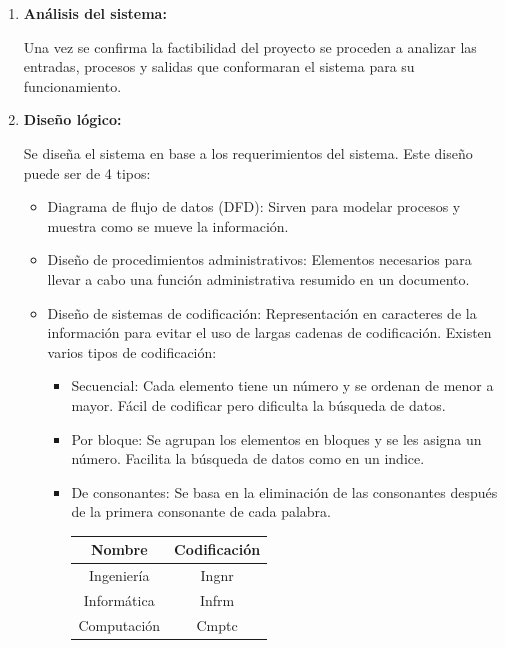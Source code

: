 \documentclass{templateNote}
\begin{document}
\begin{enumerate}
    \item \hypertarget{ana_sis}{\textbf{Análisis del sistema:}} Una vez se confirma la factibilidad del proyecto se proceden a analizar las entradas, procesos y salidas que conformaran el sistema para su funcionamiento.
    \item \hypertarget{dis_log}{\textbf{Diseño lógico:}} Se diseña el sistema en base a los requerimientos del sistema. Este diseño puede ser de 4 tipos:
        \begin{itemize}
            \item Diagrama de flujo de datos (DFD): Sirven para modelar procesos y muestra como se mueve la información.
            \item Diseño de procedimientos administrativos: Elementos necesarios para llevar a cabo una función administrativa resumido en un documento.
            \item Diseño de sistemas de codificación: Representación en caracteres de la información para evitar el uso de largas cadenas de codificación. Existen varios tipos de codificación:
            \begin{itemize}
                \item Secuencial: Cada elemento tiene un número y se ordenan de menor a mayor. Fácil de codificar pero dificulta la búsqueda de datos.
                \item Por bloque: Se agrupan los elementos en bloques y se les asigna un número. Facilita la búsqueda de datos como en un indice.
                \item De consonantes: Se basa en la eliminación de las consonantes después de la primera consonante de cada palabra.
                \begin{tcolorbox}[colback=green!10!white,colframe=green!75!black,title=Ejemplo de codificación de consonantes]
                    \begin{center}
                        \begin{tabular}{|c|c|}
                            \hline
                            \textbf{Nombre} & \textbf{Codificación} \\ \hline
                            Ingeniería & Ingnr \\ \hline
                            Informática & Infrm \\ \hline
                            Computación & Cmptc \\ \hline
                        \end{tabular}
                    \end{center}

\end{tcolorbox}
\end{itemize}
\end{itemize}
\end{enumerate}
\end{document}
